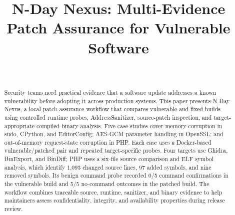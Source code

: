 \documentclass[conference]{IEEEtran}
\newcommand{\tool}{N-Day Nexus}
\begin{document}
\title{N-Day Nexus: Multi-Evidence Patch Assurance for Vulnerable Software}

\author{
 \\[0.2em]
}

\maketitle

\begin{abstract}
Security teams need practical evidence that a software update addresses a known vulnerability before adopting it across production systems. This paper presents \tool, a local patch-assurance workflow that compares vulnerable and fixed builds using controlled runtime probes, AddressSanitizer, source-patch inspection, and target-appropriate compiled-binary analysis. Five case studies cover memory corruption in sudo, CPython, and EditorConfig; AES-GCM parameter handling in OpenSSL; and out-of-memory request-state corruption in PHP. Each case uses a Docker-based vulnerable/patched pair and repeated target-specific probes. Four targets use Ghidra, BinExport, and BinDiff; PHP uses a six-file source comparison and ELF symbol analysis, which identify 1,093 changed source lines, 97 added symbols, and nine removed symbols. Its benign command probe recorded 0/5 command confirmations in the vulnerable build and 5/5 no-command outcomes in the patched build. The workflow combines traceable source, runtime, sanitizer, and binary evidence to help maintainers assess confidentiality, integrity, and availability properties during release review.
\end{abstract}
\end{document}
